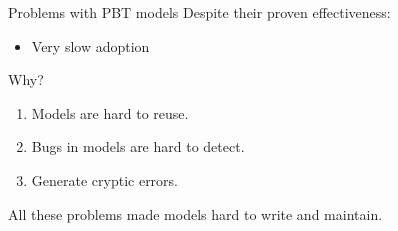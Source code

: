 \documentclass[aspectratio=169, 10pt]{beamer}
\begin{document}
\begin{frame}[label={sec:orgdcfad98}]{Problems with PBT models}
\onslide<+->
\onslide<+->
Despite their proven effectiveness:
\begin{itemize}
\item Very slow adoption
\end{itemize}

\vspace{10pt}
\onslide<+->
Why?

\vspace{10pt}

\begin{enumerate}
\item Models are hard to reuse.
\item Bugs in models are hard to detect.
\item Generate cryptic errors.
\end{enumerate}
\onslide<+->
\vspace{10pt}

All these problems made models hard to write and maintain.
\end{frame}
\end{document}
